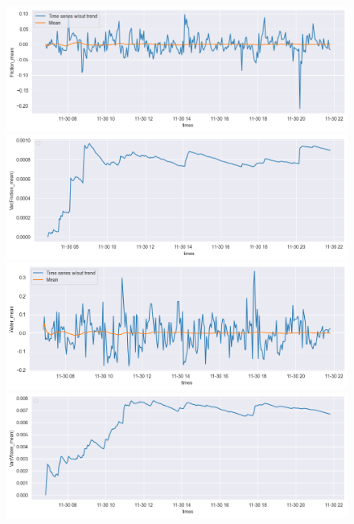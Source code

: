 \documentclass[12pt, bachelor, substylefile = algo_title.rtx]{disser}
\theoremstyle{definition}
\begin{document}
\begin{figure}[!h]
   \begin{minipage}{.48\textwidth}
     \includegraphics[width=\linewidth]{mean1}
   \end{minipage} \hfill
\begin{minipage}{.48\textwidth}
     \includegraphics[width=\linewidth]{var1}
   \end{minipage}
   \begin{minipage}{.48\textwidth}
     \includegraphics[width=\linewidth]{mean2}
   \end{minipage} \hfill
\begin{minipage}{.48\textwidth}
     \includegraphics[width=\linewidth]{var2}

\end{minipage}
\end{figure}
\end{document}
